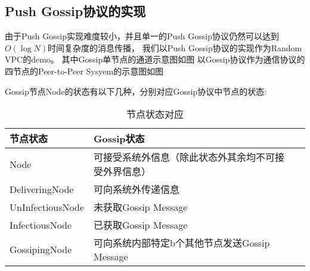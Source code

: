 \subsection{Push Gossip协议的实现}
由于Push Gossip实现难度较小，并且单一的Push Gossip协议仍然可以达到$O(\log N)$时间复杂度的消息传播，
我们以Push Gossip协议的实现作为Random VPC的demo。
其中Gossip单节点的通道示意图如图
以Gossip协议作为通信协议的四节点的Peer-to-Peer Sysyem的示意图如图



Gossip节点Node的状态有以下几种，分别对应Gossip协议中节点的状态:
\begin{table}[!hpt]
    \caption[节点状态对应]{节点状态对应\footnotemark}
    \label{tab:firstone}
    \centering
    \begin{tabular}{@{}llr@{}} \toprule
      节点状态 & Gossip状态 \\ \midrule
      Node&可接受系统外信息（除此状态外其余均不可接受外界信息）\\
      DeliveringNode&可向系统外传递信息\\
      UnInfectiousNode&未获取Gossip Message\\
      InfectiousNode&已获取Gossip Message\\
      GossipingNode&可向系统内部特定b个其他节点发送Gossip Message\\ \bottomrule
    \end{tabular}
  \end{table}

